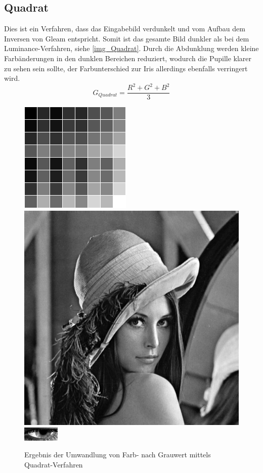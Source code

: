 \subsection{Quadrat}
\label{gray_Quadrat}
Dies ist ein Verfahren, dass das Eingabebild verdunkelt und vom Aufbau dem Inversen von Gleam entspricht. Somit ist das gesamte Bild dunkler als bei dem Luminance-Verfahren, siehe \autoref{img_Quadrat}.
Durch die Abdunklung werden kleine Farbänderungen in den dunklen Bereichen reduziert, wodurch die Pupille klarer zu sehen sein sollte, der Farbunterschied zur Iris allerdings ebenfalls verringert wird.
\[G_{Quadrat}=\dfrac{R^2+G^2+B^2}{3}\]
\begin{figure}
	\centering
	\includegraphics[width=0.2\linewidth]{img/Farbkarte_Quadrat}
	\includegraphics[width=0.2\linewidth]{img/Lena_Quadrat}
	\includegraphics[width=0.2\linewidth]{img/Auge_QuadratGray}
	\caption{Ergebnis der Umwandlung von Farb- nach Grauwert mittels Quadrat-Verfahren}
	\label{img_Quadrat}
\end{figure}
